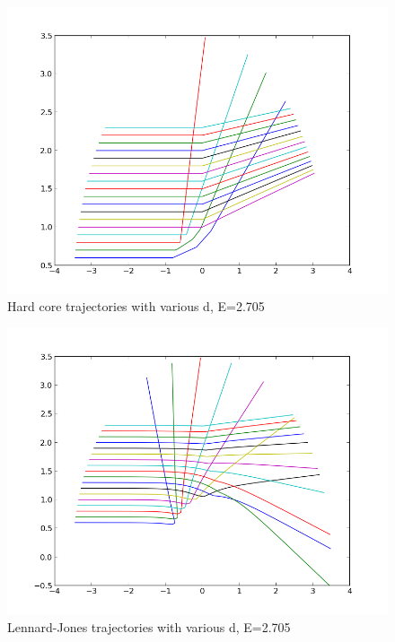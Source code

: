 \documentclass[11pt,letterpaper]{article}
\begin{document}
\begin{figure}
\begin{center}
\includegraphics[width=0.9\linewidth,angle=0]{p2allhard2715.png}
\caption{Hard core trajectories with various d, E=2.705}
\label{figure8}
\end{center}
\end{figure}


\begin{figure}
\begin{center}
\includegraphics[width=0.9\linewidth,angle=0]{p2alldtra2715.png}
\caption{Lennard-Jones trajectories with various d, E=2.705}
\label{figure9}
\end{center}
\end{figure}
\end{document}
